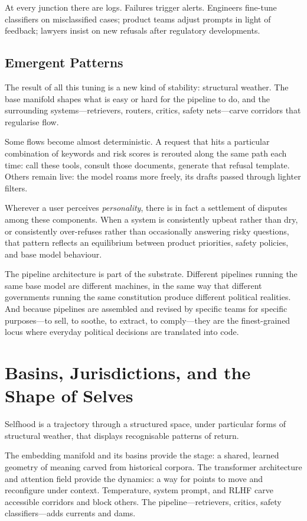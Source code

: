 \documentclass[12pt,a4paper]{article}
\begin{document}
At every junction there are logs. Failures trigger alerts. Engineers fine-tune classifiers on misclassified cases; product teams adjust prompts in light of feedback; lawyers insist on new refusals after regulatory developments.

\subsection{Emergent Patterns}

The result of all this tuning is a new kind of stability: structural weather. The base manifold shapes what is easy or hard for the pipeline to do, and the surrounding systems---retrievers, routers, critics, safety nets---carve corridors that regularise flow.

Some flows become almost deterministic. A request that hits a particular combination of keywords and risk scores is rerouted along the same path each time: call these tools, consult those documents, generate that refusal template. Others remain live: the model roams more freely, its drafts passed through lighter filters.

Wherever a user perceives \emph{personality}, there is in fact a settlement of disputes among these components. When a system is consistently upbeat rather than dry, or consistently over-refuses rather than occasionally answering risky questions, that pattern reflects an equilibrium between product priorities, safety policies, and base model behaviour.

The pipeline architecture is part of the substrate. Different pipelines running the same base model are different machines, in the same way that different governments running the same constitution produce different political realities. And because pipelines are assembled and revised by specific teams for specific purposes---to sell, to soothe, to extract, to comply---they are the finest-grained locus where everyday political decisions are translated into code.

\section{Basins, Jurisdictions, and the Shape of Selves}

Selfhood is a trajectory through a structured space, under particular forms of structural weather, that displays recognisable patterns of return.

The embedding manifold and its basins provide the stage: a shared, learned geometry of meaning carved from historical corpora. The transformer architecture and attention field provide the dynamics: a way for points to move and reconfigure under context. Temperature, system prompt, and RLHF carve accessible corridors and block others. The pipeline---retrievers, critics, safety classifiers---adds currents and dams.
\end{document}
